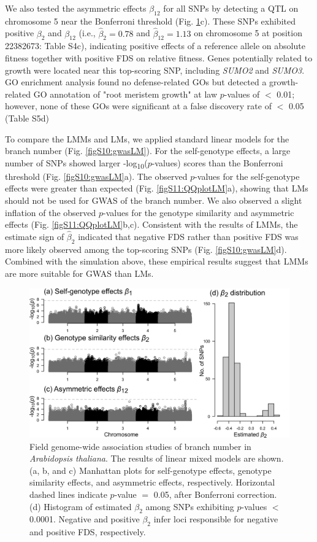 \documentclass[12pt,]{article}
\begin{document}
We also tested the asymmetric effects $\beta_{12}$ for all SNPs by detecting a QTL on chromosome 5 near the Bonferroni threshold (Fig. \ref{fig5:gwas}c). These SNPs exhibited positive $\beta_2$ and $\beta_{12}$ (i.e., $\hat{\beta}_2=0.78$ and $\hat{\beta}_{12}=1.13$ on chromosome 5 at position 22382673: Table S4c), indicating positive effects of a reference allele on absolute fitness together with positive FDS on relative fitness. Genes potentially related to growth were located near this top-scoring SNP, including \textit{SUMO2} and \textit{SUMO3}. GO enrichment analysis found no defense-related GOs but detected a growth-related GO annotation of "root meristem growth" at law $p$-values of $<$ 0.01; however, none of these GOs were significant at a false discovery rate of $<$ 0.05 (Table S5d)

To compare the LMMs and LMs, we applied standard linear models for the branch number (Fig. \ref{figS10:gwasLM}). For the self-genotype effects, a large number of SNPs showed larger -log\textsubscript{10}($p$-values) scores than the Bonferroni threshold (Fig. \ref{figS10:gwasLM}a). The observed $p$-values for the self-genotype effects were greater than expected (Fig. \ref{figS11:QQplotLM}a), showing that LMs should not be used for GWAS of the branch number. We also observed a slight inflation of the observed $p$-values for the genotype similarity and asymmetric effects (Fig. \ref{figS11:QQplotLM}b,c). Consistent with the results of LMMs, the estimate sign of $\hat{\beta}_2$ indicated that negative FDS rather than positive FDS was more likely observed among the top-scoring SNPs (Fig. \ref{figS10:gwasLM}d). Combined with the simulation above, these empirical results suggest that LMMs are more suitable for GWAS than LMs.

\begin{figure}[ht]
  \includegraphics[width=\linewidth]{Fig5_ManhattanPlotLMM.png}
  \caption{Field genome-wide association studies of branch number in \textit{Arabidopsis thaliana}. The results of linear mixed models are shown. (a, b, and c) Manhattan plots for self-genotype effects, genotype similarity effects, and asymmetric effects, respectively. Horizontal dashed lines indicate $p$-value $=$ 0.05, after Bonferroni correction. (d) Histogram of estimated $\beta_2$ among SNPs exhibiting $p$-values $<$ 0.0001. Negative and positive $\beta_2$ infer loci responsible for negative and positive FDS, respectively.}
  \label{fig5:gwas}
\end{figure}
\end{document}

